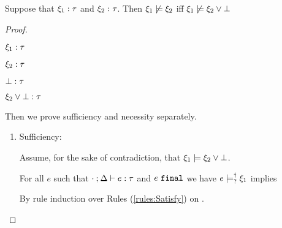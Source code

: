 \begin{lem}
  \label{lem:relax-not-redundant}
  Suppose that $\xi_1 : \tau$ and $\xi_2 : \tau$. Then $\xi_1 \not\models \xi_2$ iff $\xi_1 \not\models \xi_2 \vee \bot$
\end{lem}
\begin{proof}

  \begin{pfsteps*}
  \item $\xi_1 : \tau$  
  \item $\xi_2 : \tau$  
  \item $\bot : \tau$  
  \item $\xi_2 \vee \bot : \tau$  
  \end{pfsteps*}
  Then we prove sufficiency and necessity separately.
\begin{enumerate}
  
\item Sufficiency:
  Assume, for the sake of contradiction, that $\xi_1 \models \xi_2 \vee \bot$. 
  For all $e$ such that $\cdot \mathbin{;} \Delta \vdash e : \tau$ and $e ~\mathtt{final}$ we have $e \models_{?}^{\dag} \xi_1$ implies
  By rule induction over Rules (\ref{rules:Satisfy}) on .
  \begin{byCases}


\end{byCases}
\end{enumerate}
\end{proof}
